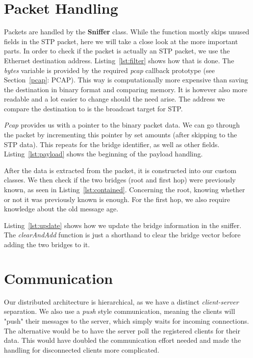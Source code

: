 \section{Packet Handling}
\label{packet_handling}
Packets are handled by the \textbf{Sniffer} class.
While the function mostly skips unused fields in the STP packet, here we will take a close look at the more important parts.
In order to check if the packet is actually an STP packet, we use the Ethernet destination address.
Listing~\ref{lst:filter} shows how that is done.
The \textit{bytes} variable is provided by the required \textit{pcap} callback prototype (see Section~\ref{pcap}: PCAP).
This way is computationally more expensive than saving the destination in binary format and comparing memory.
It is however also more readable and a lot easier to change should the need arise.
The address we compare the destination to is the broadcast target for STP.


\textit{Pcap} provides us with a pointer to the binary packet data.
We can go through the packet by incrementing this pointer by set amounts (after skipping to the STP data).
This repeats for the bridge identifier, as well as other fields.
Listing~\ref{lst:payload} shows the beginning of the payload handling.


After the data is extracted from the packet, it is constructed into our custom classes.
We then check if the two bridges (root and first hop) were previously known, as seen in Listing~\ref{lst:contained}.
Concerning the root, knowing whether or not it was previously known is enough.
For the first hop, we also require knowledge about the old message age.


Listing~\ref{lst:update} shows how we update the bridge information in the sniffer.
The \textit{clearAndAdd} function is just a shorthand to clear the bridge vector before adding the two bridges to it.


\section{Communication}
\label{communication}
Our distributed architecture is hierarchical, as we have a distinct \textit{client-server} separation.
We also use a \textit{push} style communication, meaning the clients will "push" their messages to the server, which simply waits for incoming connections.
The alternative would be to have the server poll the registered clients for their data.
This would have doubled the communication effort needed and made the handling for disconnected clients more complicated.

